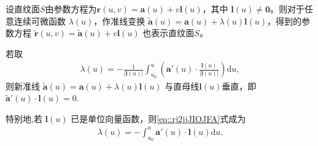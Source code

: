 \documentclass[../../main.tex]{subfiles}%
\begin{document}
\begin{theorem}
设直纹面$S$由参数方程为$\bm{r}(u,v)=\bm{a}(u)+v\bm{l}(u)$，其中 $\bm{l}(u)\neq\bm{0}$。则对于任意连续可微函数 $\lambda(u)$，作准线变换 $\tilde{\bm{a}}(u)=\bm{a}(u)+\lambda(u)\bm{l}(u)$，得到的参数方程 $\tilde{\bm{r}}(u,v)=\tilde{\bm{a}}(u)+v\bm{l}(u)$ 也表示直纹面$S$。

若取
\begin{align}\label{eq::rj2jjJIOJFA}
\lambda(u)=-\frac{1}{|\bm{l}(u)|}\int_{u_0}^{u}\left(\bm{a}'(u)\cdot\frac{\bm{l}(u)}{|\bm{l}(u)|}\right)\mathrm{d}u,
\end{align}
则新准线 $\tilde{\bm{a}}(u)=\bm{a}(u)+\lambda(u)\bm{l}(u)$ 与直母线$\bm{l}(u)$垂直，即 $\tilde{\bm{a}}'(u)\cdot\bm{l}(u)=0$.

特别地,若 $\bm{l}(u)$ 已是单位向量函数，则\eqref{eq::rj2jjJIOJFA}式成为
\begin{align*}
\lambda(u) = -\int_{u_0}^{u}\bm{a}'(u)\cdot \bm{l}(u)\mathrm{d}u.
\end{align*}
\end{theorem}
\end{document}
